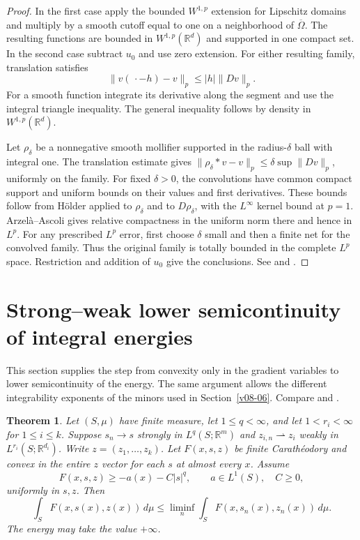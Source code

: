 \documentclass[11pt,oneside,openany]{book}
\newcommand{\R}{\mathbb R}
\newcommand{\norm}[1]{\lVert #1\rVert}
\theoremstyle{plain}
\newtheorem{theorem}{Theorem}[chapter]
\theoremstyle{definition}
\theoremstyle{remark}
\begin{document}
\begin{proof}
In the first case apply the bounded \(W^{1,p}\) extension for
Lipschitz domains and multiply by a smooth cutoff equal to one on
a neighborhood of \(\overline\Omega\). The resulting functions
are bounded in \(W^{1,p}(\R^d)\) and supported in one compact set.
In the second case subtract \(u_0\) and use zero extension.
For either resulting family, translation satisfies
\[
 \norm{v(\,\cdot-h)-v}_p\le |h|\norm{Dv}_p.
\]
For a smooth function integrate its derivative along the segment
and use the integral triangle inequality. The general inequality
follows by density in \(W^{1,p}(\R^d)\).

Let \(\rho_\delta\) be a nonnegative smooth mollifier supported in
the radius-\(\delta\) ball with integral one. The translation
estimate gives \(\norm{\rho_\delta*v-v}_p\le
\delta\sup\norm{Dv}_p\), uniformly on the family. For fixed
\(\delta>0\), the convolutions have common compact support and
uniform bounds on their values and first derivatives. These
bounds follow from H\"older applied to \(\rho_\delta\) and to
\(D\rho_\delta\), with the \(L^\infty\) kernel bound at \(p=1\).
Arzel\`a--Ascoli gives relative compactness in the uniform norm
there and hence in \(L^p\). For any prescribed \(L^p\) error, first
choose \(\delta\) small and then a finite net for the convolved
family. Thus the original family is totally bounded in the
complete \(L^p\) space. Restriction and addition of \(u_0\)
give the conclusions. See \cite[Section 1.4]{Dacorogna} and
\cite[Unit U5]{MathGenomeP102}.
\end{proof}

\section{Strong--weak lower semicontinuity of integral energies}
\label{v08-02}

This section supplies the step from convexity only in the gradient
variables to lower semicontinuity of the energy. The same argument
allows the different integrability exponents of the minors used
in Section~\ref{v08-06}. Compare
\cite[Theorem 3.3, Remark 3.4, and Section 3.3.2]{Dacorogna} and
\cite[Chapter VIII, Section 1]{EkelandTemam}.

\begin{theorem}\label{thm:strong-weak-integral}
Let \((S,\mu)\) have finite measure, let \(1\le q<\infty\), and let
\(1<r_i<\infty\) for \(1\le i\le k\). Suppose
\(s_n\to s\) strongly in \(L^q(S;\R^m)\) and
\(z_{i,n}\rightharpoonup z_i\) weakly in \(L^{r_i}(S;\R^{d_i})\).
Write \(z=(z_1,\ldots,z_k)\). Let \(F(x,s,z)\) be finite
Carath\'eodory and convex in the entire \(z\) vector for each
\(s\) at almost every \(x\). Assume
\[
 F(x,s,z)\ge -a(x)-C|s|^q,\qquad a\in L^1(S),\quad C\ge0,
\]
uniformly in \(s,z\). Then
\[
 \int_S F(x,s(x),z(x))\,d\mu
 \le \liminf_n\int_S F(x,s_n(x),z_n(x))\,d\mu .
\]
The energy may take the value \(+\infty\).
\end{theorem}
\end{document}
